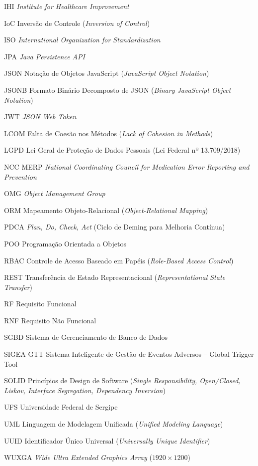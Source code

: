 \begin{siglas}
    \item[IHI] \textit{Institute for Healthcare Improvement}
    \item[IoC] Inversão de Controle (\textit{Inversion of Control})
    \item[ISO] \textit{International Organization for Standardization}
    \item[JPA] \textit{Java Persistence API}
    \item[JSON] Notação de Objetos JavaScript (\textit{JavaScript Object Notation})
    \item[JSONB] Formato Binário Decomposto de JSON (\textit{Binary JavaScript Object Notation})
    \item[JWT] \textit{JSON Web Token}
    \item[LCOM] Falta de Coesão nos Métodos (\textit{Lack of Cohesion in Methods})
    \item[LGPD] Lei Geral de Proteção de Dados Pessoais (Lei Federal nº 13.709/2018)
    \item[NCC MERP] \textit{National Coordinating Council for Medication Error Reporting and Prevention}
    \item[OMG] \textit{Object Management Group}
    \item[ORM] Mapeamento Objeto-Relacional (\textit{Object-Relational Mapping})
    \item[PDCA] \textit{Plan, Do, Check, Act} (Ciclo de Deming para Melhoria Contínua)
    \item[POO] Programação Orientada a Objetos
    \item[RBAC] Controle de Acesso Baseado em Papéis (\textit{Role-Based Access Control})
    \item[REST] Transferência de Estado Representacional (\textit{Representational State Transfer})
    \item[RF] Requisito Funcional
    \item[RNF] Requisito Não Funcional
    \item[SGBD] Sistema de Gerenciamento de Banco de Dados
    \item[SIGEA-GTT] Sistema Inteligente de Gestão de Eventos Adversos -- Global Trigger Tool
    \item[SOLID] Princípios de Design de Software (\textit{Single Responsibility, Open/Closed, Liskov, Interface Segregation, Dependency Inversion})
    \item[UFS] Universidade Federal de Sergipe
    \item[UML] Linguagem de Modelagem Unificada (\textit{Unified Modeling Language})
    \item[UUID] Identificador Único Universal (\textit{Universally Unique Identifier})
    \item[WUXGA] \textit{Wide Ultra Extended Graphics Array} ($1920 \times 1200$)
\end{siglas}
